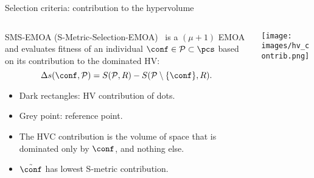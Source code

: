 \begin{frame}[allowframebreaks]{Selection criteria: contribution to the hypervolume}

\begin{columns}
\begin{column}{0.5\textwidth}
SMS-EMOA (S-Metric-Selection-EMOA)~ is a $(\mu+1)$ EMOA and evaluates fitness of an individual $\xx \in \mathcal{P} \subset \XX$ based on its contribution to the dominated HV:
$$
\Delta s(\xx, \mathcal{P}) = S(\mathcal{P}, R) - S(\mathcal{P} \setminus \{ \xx\}, R).
$$

\begin{itemize}
\item Dark rectangles: HV contribution of dots.
\item Grey point: reference point.
\item The HVC contribution is the volume of space that is dominated only by $\xx$, and nothing else.
\item $\tilde{\xx}$ has lowest S-metric contribution.
\end{itemize}
\end{column}

\begin{column}{0.5\textwidth}
\begin{center}
\texttt{[image: images/hv\_contrib.png]}
\end{center}
\end{column}
\end{columns}

\end{frame}

